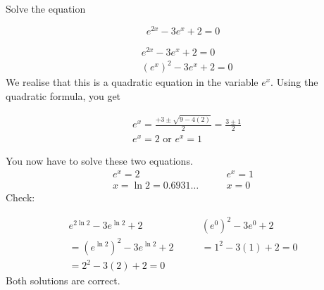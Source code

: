 \begin{example} Solve the equation

\[
e^{2 x}-3 e^x+2=0
\]

\begin{solution}

\[
\begin{aligned}
& e^{2 x}-3 e^x+2=0 \\
& \left(e^x\right)^2-3 e^x+2=0
\end{aligned}
\]
We realise that this is a quadratic equation in the variable $e^x$. Using the quadratic formula, you get

\[
\begin{aligned}
& e^x=\frac{+3 \pm \sqrt{9-4(2)}}{2}=\frac{3 \pm 1}{2} \\
& e^x=2 \text { or } e^x=1
\end{aligned}
\]


You now have to solve these two equations.
\[
\begin{array}{ll}
e^x=2 & \qquad e^x=1 \\
x=\ln 2=0.6931 \ldots & \qquad x=0
\end{array}
\]
Check:

\[
\begin{array}{ll}
e^{2 \ln 2}-3 e^{\ln 2}+2 & \qquad \left(e^0\right)^2-3 e^0+2 \\
=\left(e^{\ln 2}\right)^2-3 e^{\ln 2}+2 & \qquad =1^2-3(1)+2=0 \\
=2^2-3(2)+2=0 &
\end{array}
\]
Both solutions are correct.
\end{solution}  
\end{example}

